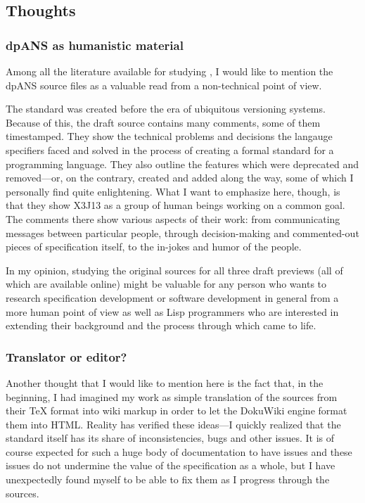 \subsection{Thoughts}

\subsubsection{dpANS as humanistic material}
Among all the literature available for studying \cl{}, I would like to mention the dpANS source files as a valuable read from a non-technical point of view.

The standard was created before the era of ubiquitous versioning systems. Because of this, the draft source contains many comments, some of them timestamped. They show the technical problems and decisions the langauge specifiers faced and solved in the process of creating a formal standard for a programming language. They also outline the features which were deprecated and removed---or, on the contrary, created and added along the way, some of which I personally find quite enlightening. What I want to emphasize here, though, is that they show X3J13 as a group of human beings working on a common goal. The comments there show various aspects of their work: from communicating messages between particular people, through decision-making and commented-out pieces of specification itself, to the in-jokes and humor of the people.

In my opinion, studying the original sources for all three draft previews (all of which are available online) might be valuable for any person who wants to research specification development or software development in general from a more human point of view as well as Lisp programmers who are interested in extending their background and the process through which \cl{} came to life.

\subsubsection{Translator or editor?}
Another thought that I would like to mention here is the fact that, in the beginning, I had imagined my work as simple translation of the sources from their \TeX{} format into wiki markup in order to let the DokuWiki engine format them into HTML. Reality has verified these ideas---I quickly realized that the standard itself has its share of inconsistencies, bugs and other issues. It is of course expected for such a huge body of documentation to have issues and these issues do not undermine the value of the specification as a whole, but I have unexpectedly found myself to be able to fix them as I progress through the sources.

